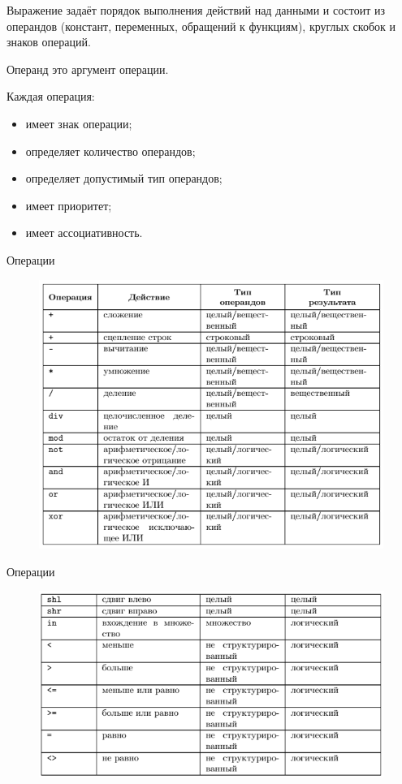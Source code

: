 \documentclass{beamer}
\begin{document}
\begin{frame}
\begin{block}{Выражение}
задаёт порядок выполнения действий над данными и состоит из операндов (констант, переменных, обращений к функциям), круглых скобок и знаков операций.
\end{block}
\begin{block}{Операнд}
это аргумент операции.
\end{block}
Каждая операция:
\begin{itemize}
\item имеет знак операции;
\item определяет количество операндов;
\item определяет допустимый тип операндов;
\item имеет приоритет;
\item имеет ассоциативность.
\end{itemize}
\end{frame}

\begin{frame}{Операции}
\begin{figure}[h]
\centering
\includegraphics[scale=0.75]{images/lec02-pic11.png}
\end{figure}
\end{frame} 

\begin{frame}{Операции}
\begin{figure}[h]
\centering
\includegraphics[scale=0.75]{images/lec02-pic12.png}
\end{figure}
\end{frame} 
\end{document}
